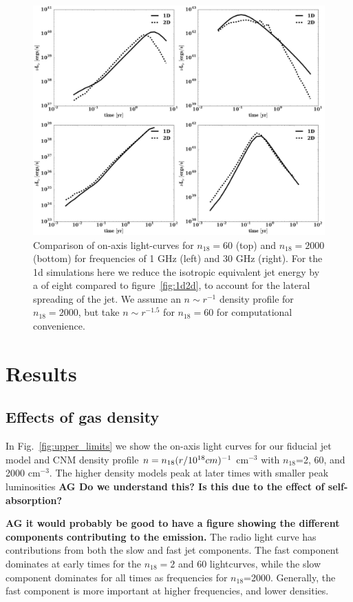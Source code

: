 \documentclass[usenatbib,fleqn]{mn2e}
\begin{document}
\begin{figure}
\includegraphics[width=16cm]{1d_2d.pdf}
\caption{\label{fig:1d2dB} Comparison of on-axis light-curves for
  $n_{18}=60$ (top) and $n_{18}=2000$ (bottom) for frequencies of 1
  GHz (left) and 30 GHz (right). For the 1d simulations here we reduce
  the isotropic equivalent jet energy by a of eight compared to
  figure~\ref{fig:1d2d}, to account for the lateral spreading of the
  jet. We assume an $n\sim r^{-1}$ density profile for $n_{18}=2000$, but
  take $n\sim r^{-1.5}$ for $n_{18}=60$ for computational convenience.}
\end{figure}


\section{Results}
\label{sec:results}

\subsection{Effects of gas density}

In Fig.~\ref{fig:upper_limits} we show the on-axis light curves for
our fiducial jet model and CNM density profile $n=n_{18} (r/10^{18}
{\rm} cm)^{-1}$ cm$^{-3}$ with $n_{18}$=2, 60, and 2000 cm$^{-3}$. The
higher density models peak at later times with smaller peak
luminosities {\bf AG Do we understand this? Is this due to the effect
  of self-absorption?}

{\bf AG it would probably be good to have a figure showing the
  different components contributing to the emission.} The radio light
curve has contributions from both the slow and fast jet
components. The fast component dominates at
early times for the $n_{18}=2$ and 60 lightcurves, while the slow
component dominates for all times as frequencies for
$n_{18}$=2000. Generally, the fast component is more important at
higher frequencies, and lower densities.
\end{document}
